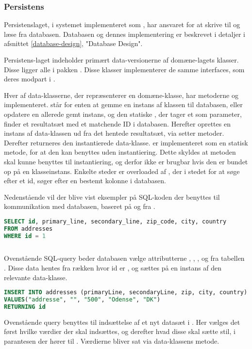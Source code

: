 \documentclass[../../main.tex]{subfiles}
\begin{document}
\subsubsection{Persistens}
Persistenslaget, i systemet implementeret som , har ansvaret for at skrive til og læse fra databasen. Databasen og dennes implementering er beskrevet i detaljer i afsnittet \ref{database-design}, "Database Design". 

Persistens-laget indeholder primært data-versionerne af domæne-lagets klasser. Disse ligger alle i pakken . Disse klasser implementerer de samme interfaces, som deres modpart i .

Hver af data-klasserne, der repræsenterer en domæne-klasse, har metoderne  og  implementeret. står for enten at gemme en instans af klassen til databasen, eller opdatere en allerede gemt instans, og den statiske , der tager et  som parameter, finder et resultatsæt med et matchende ID i databasen. Herefter oprettes en instans af data-klassen ud fra det hentede resultatsæt, via setter metoder. Derefter returneres den instantierede data-klasse.
 er implementeret som en statisk metode, for at den kan benyttes uden instantiering. Dette skyldes at metoden skal kunne benyttes til instantiering, og derfor ikke er brugbar hvis den er bundet op på en klasseinstans. Enkelte steder er  overloaded af , der i stedet for at søge efter et id, søger efter en bestemt kolonne i databasen.

Nedenstående vil der blive vist eksempler på SQL-koden der benyttes til kommunikation med databasen, baseret på  og  fra .

\begin{lstlisting}[language=sql, caption=DataAddress.find() - SQL SELECT ,captionpos=b, label=DataAddress.find()]
SELECT id, primary_line, secondary_line, zip_code, city, country 
FROM addresses 
WHERE id = 1
     

\end{lstlisting}
Ovenstående SQL-query beder databasen vælge attributterne , , ,  og  fra tabellen . Disse data hentes fra rækken hvor id er , og sættes på en instans af den relevante data-klasse.

\begin{lstlisting}[language=sql, caption=DataAddress.save() - SQL UPDATE,captionpos=b, label=DataAddress.save().sqlupdate]
INSERT INTO addresses (primaryLine, secondaryLine, zip, city, country) 
VALUES("addresse", "", "500", "Odense", "DK") 
RETURNING id
\end{lstlisting}
Ovenstående query benyttes til indsættelse af et nyt datasæt i . Her vælges det først hvilke værdier der skal indsættes, og derefter hvad disse skal sætte stil, i parantesen der hører til . Værdierne bliver sat via data-klassens  metode.
\end{document}

